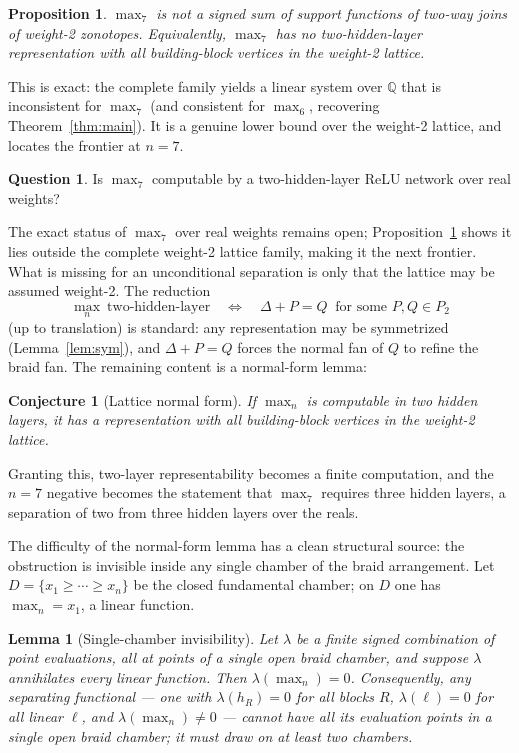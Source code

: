 \documentclass[11pt]{article}
\newtheorem{lemma}{Lemma}
\newtheorem{proposition}{Proposition}
\newtheorem{conjecture}{Conjecture}
\theoremstyle{definition}
\newtheorem{question}{Question}
\begin{document}
\begin{proposition}\label{prop:max7}
$\max_7$ is not a signed sum of support functions of two-way joins of weight-2 zonotopes. Equivalently,
$\max_7$ has no two-hidden-layer representation with all building-block vertices in the weight-2 lattice.
\end{proposition}

This is exact: the complete family yields a linear system over $\mathbb{Q}$ that is inconsistent for
$\max_7$ (and consistent for $\max_6$, recovering Theorem~\ref{thm:main}). It is a genuine lower bound over
the weight-2 lattice, and locates the frontier at $n=7$.

\begin{question}
Is $\max_7$ computable by a two-hidden-layer ReLU network over real weights?
\end{question}

The exact status of $\max_7$ over real weights remains open; Proposition~\ref{prop:max7} shows it lies
outside the complete weight-2 lattice family, making it the next frontier. What is missing for an
unconditional separation is only that the lattice may be assumed weight-2. The reduction
\[
   \max_n\ \text{two-hidden-layer}\quad\Longleftrightarrow\quad \Delta+P=Q\ \text{ for some } P,Q\in P_2
\]
(up to translation) is standard: any representation may be symmetrized (Lemma~\ref{lem:sym}), and
$\Delta+P=Q$ forces the normal fan of $Q$ to refine the braid fan. The remaining content is a normal-form
lemma:

\begin{conjecture}[Lattice normal form]
If $\max_n$ is computable in two hidden layers, it has a representation with all building-block vertices in
the weight-2 lattice.
\end{conjecture}

Granting this, two-layer representability becomes a finite computation, and the $n=7$ negative becomes the
statement that $\max_7$ requires three hidden layers, a separation of two from three hidden layers over the
reals.

The difficulty of the normal-form lemma has a clean structural source: the obstruction is invisible inside
any single chamber of the braid arrangement. Let $D=\{x_1\ge\cdots\ge x_n\}$ be the closed fundamental
chamber; on $D$ one has $\max_n=x_1$, a linear function.

\begin{lemma}[Single-chamber invisibility]\label{lem:chamber}
Let $\lambda$ be a finite signed combination of point evaluations, all at points of a single open braid
chamber, and suppose $\lambda$ annihilates every linear function. Then $\lambda(\max_n)=0$. Consequently,
any separating functional --- one with $\lambda(h_R)=0$ for all blocks $R$, $\lambda(\ell)=0$ for all
linear $\ell$, and $\lambda(\max_n)\ne 0$ --- cannot have all its evaluation points in a single open braid
chamber; it must draw on at least two chambers.
\end{lemma}
\end{document}

